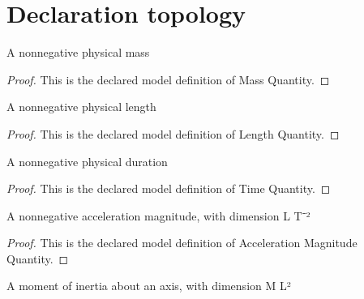 \section{Declaration topology}
\begin{definition}
  \label{def:physics:phyx-mini-0262:phyxminiproblems-problemphyxmini0262-massquantity}
  A nonnegative physical mass
\end{definition}
\begin{proof}
  This is the declared model definition of Mass Quantity.
\end{proof}
\begin{definition}
  \label{def:physics:phyx-mini-0262:phyxminiproblems-problemphyxmini0262-lengthquantity}
  A nonnegative physical length
\end{definition}
\begin{proof}
  This is the declared model definition of Length Quantity.
\end{proof}
\begin{definition}
  \label{def:physics:phyx-mini-0262:phyxminiproblems-problemphyxmini0262-timequantity}
  A nonnegative physical duration
\end{definition}
\begin{proof}
  This is the declared model definition of Time Quantity.
\end{proof}
\begin{definition}
  \label{def:physics:phyx-mini-0262:phyxminiproblems-problemphyxmini0262-accelerationmagnitudequantity}
  A nonnegative acceleration magnitude, with dimension L T⁻²
\end{definition}
\begin{proof}
  This is the declared model definition of Acceleration Magnitude Quantity.
\end{proof}
\begin{definition}
  \label{def:physics:phyx-mini-0262:phyxminiproblems-problemphyxmini0262-momentofinertiaquantity}
  A moment of inertia about an axis, with dimension M L²
\end{definition}
